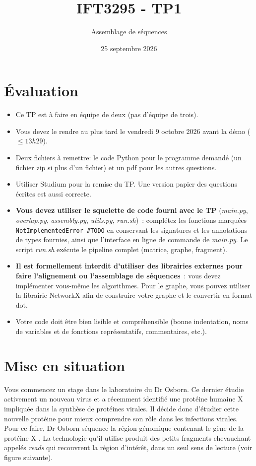 \documentclass[12pt]{article}
\title{IFT3295 - TP1}
\author{Assemblage de séquences}
\date{25 septembre 2026}
\begin{document}
\maketitle
\section*{Évaluation}
\begin{itemize}
	\item  Ce TP est à faire en équipe de deux (pas d’équipe de trois).
	\item Vous devez le rendre au plus tard le
	      vendredi 9 octobre 2026 avant la démo ($\leq13h29$).
	\item Deux fichiers à remettre: le code Python pour le programme demandé (un fichier
	      zip si plus d'un fichier)
	      et un pdf pour les autres questions.
	\item Utiliser Studium pour la remise du TP. Une version papier des questions écrites est aussi
	      correcte.
	\item \textbf{Vous devez utiliser le squelette de code fourni avec le TP}
	      ({\it main.py}, {\it overlap.py}, {\it assembly.py}, {\it utils.py},
	      {\it run.sh})~: complétez les fonctions marquées
	      \texttt{NotImplementedError~\#TODO} en conservant les signatures et
	      les annotations de types fournies, ainsi que l'interface en ligne de
	      commande de {\it main.py}. Le script {\it run.sh} exécute le
	      pipeline complet (matrice, graphe, fragment).
	\item \textbf{Il est formellement interdit d'utiliser des librairies
	      externes pour faire l'alignement ou l'assemblage de séquences}~:
	      vous devez implémenter vous-même les algorithmes. Pour le graphe,
	      vous pouvez utiliser la librairie NetworkX afin de construire votre
	      graphe et le convertir en format dot.
	\item Votre code doit être bien lisible et compréhensible (bonne
	      indentation, noms de variables et de fonctions représentatifs, commentaires,
	      etc.).
\end{itemize}


\section*{Mise en situation}

Vous commencez un stage dans le laboratoire du Dr Osborn. Ce dernier
étudie activement un nouveau virus et a récemment identifié une protéine
humaine X impliquée dans la synthèse de protéines virales. Il décide donc
d'étudier cette nouvelle protéine pour mieux comprendre son rôle dans les
infections virales. Pour ce faire, Dr Osborn séquence la région génomique
contenant le gène de la protéine X . La technologie qu'il utilise produit des
petits fragments chevauchant appelés {\it reads} qui recouvrent la région
d'intérêt,
dans un seul sens de lecture (voir figure suivante).
\end{document}
